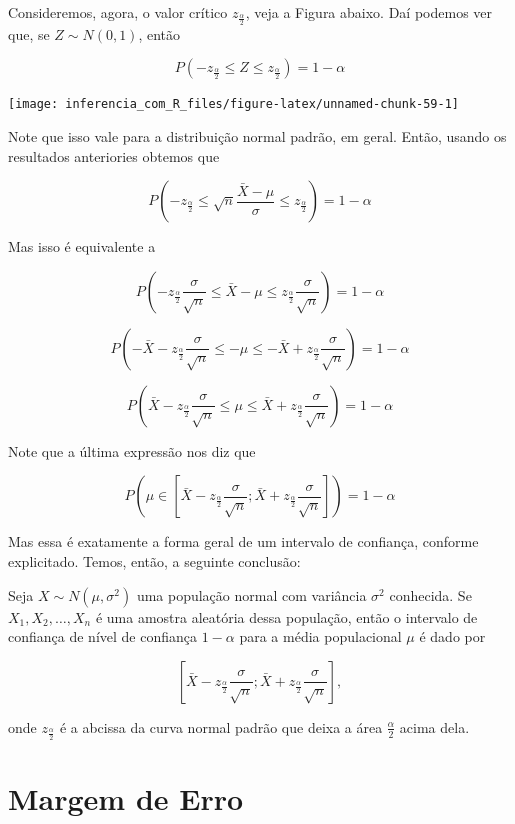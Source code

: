 \documentclass[
]{book}
\begin{document}
Consideremos, agora, o valor crítico \(z_\frac{\alpha}{2}\), veja a Figura abaixo. Daí podemos ver que, se \(Z\sim N(0,1)\), então

\[P\left(-z_\frac{\alpha}{2}\leq Z \leq z_\frac{\alpha}{2}\right)=1-\alpha\]

\begin{center}\texttt{[image: inferencia\_com\_R\_files/figure-latex/unnamed-chunk-59-1]} \end{center}

Note que isso vale para a distribuição normal padrão, em geral. Então, usando os resultados anteriories obtemos que

\[P\left(-z_\frac{\alpha}{2}\leq \sqrt{n}\frac{\bar X-\mu}{\sigma} \leq z_\frac{\alpha}{2}\right)=1-\alpha\]

Mas isso é equivalente a

\[P\left(-z_{\frac{\alpha}{2}}\frac{\sigma}{\sqrt{n}}\leq \bar X-\mu \leq z_{\frac{\alpha}{2}}\frac{\sigma}{\sqrt{n}}\right)= 1-\alpha\]

\[P\left(-\bar X-z_{\frac{\alpha}{2}}\frac{\sigma}{\sqrt{n}}\leq -\mu \leq -\bar X + z_{\frac{\alpha}{2}}\frac{\sigma}{\sqrt{n}}\right)= 1-\alpha\]

\[P\left(\bar X - z_{\frac{\alpha}{2}}\frac{\sigma}{\sqrt{n}} \leq \mu \leq \bar X+z_{\frac{\alpha}{2}}\frac{\sigma}{\sqrt{n}}\right) = 1-\alpha\]

Note que a última expressão nos diz que

\[P\left(\mu \in \left[\bar X-z_{\frac{\alpha}{2}}\frac{\sigma}{\sqrt{n}};\bar X+z_{\frac{\alpha}{2}}\frac{\sigma}{\sqrt{n}}\right]\right)=1-\alpha\]

Mas essa é exatamente a forma geral de um intervalo de confiança, conforme explicitado. Temos, então, a seguinte conclusão:

Seja \(X\sim N(\mu, \sigma^2)\) uma população normal com variância \(\sigma^2\) conhecida. Se \(X_1, X_2,\ldots , X_n\) é uma amostra aleatória dessa população, então o intervalo de confiança de nível de confiança \(1-\alpha\) para a média populacional \(\mu\) é dado por

\[\left[\bar X-z_{\frac{\alpha}{2}}\frac{\sigma}{\sqrt{n}};\bar X+z_{\frac{\alpha}{2}}\frac{\sigma}{\sqrt{n}}\right],\]

onde \(z_{\frac{\alpha}{2}}\) é a abcissa da curva normal padrão que deixa a área \(\frac{\alpha}{2}\) acima dela.

\hypertarget{margem-de-erro}{%
\section{Margem de Erro}\label{margem-de-erro}}
\end{document}
